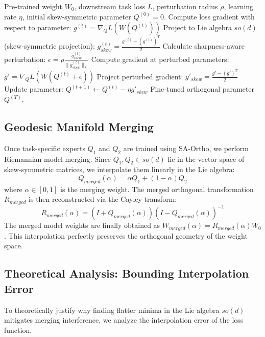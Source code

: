 \documentclass{article}
\theoremstyle{plain}
\theoremstyle{definition}
\theoremstyle{remark}
\begin{document}
\begin{algorithm}[tb]
   \caption{Sharpness-Aware Orthogonal Adaptation (SA-Ortho)}
   \label{alg:sa_ortho}
   \small
\begin{algorithmic}[1]
    Pre-trained weight $W_0$, downstream task loss $L$, perturbation radius $\rho$, learning rate $\eta$, initial skew-symmetric parameter $Q^{(0)} = 0$.
   \STATE Compute loss gradient with respect to parameter: $g^{(t)} = \nabla_Q L(W(Q^{(t)}))$
   \STATE Project to Lie algebra $so(d)$ (skew-symmetric projection): $g_{skew}^{(t)} = \frac{g^{(t)} - (g^{(t)})^T}{2}$
   \STATE Calculate sharpness-aware perturbation: $\epsilon = \rho \frac{g_{skew}^{(t)}}{\|g_{skew}^{(t)}\|_F}$
   \STATE Compute gradient at perturbed parameters: $g' = \nabla_Q L(W(Q^{(t)} + \epsilon))$
   \STATE Project perturbed gradient: $g'_{skew} = \frac{g' - (g')^T}{2}$
   \STATE Update parameter: $Q^{(t+1)} \leftarrow Q^{(t)} - \eta g'_{skew}$
   \ENDFOR
    Fine-tuned orthogonal parameter $Q^{(T)}$.
\end{algorithmic}
\end{algorithm}

\subsection{Geodesic Manifold Merging}
Once task-specific experts $Q_1$ and $Q_2$ are trained using SA-Ortho, we perform Riemannian model merging. Since $Q_1, Q_2 \in so(d)$ lie in the vector space of skew-symmetric matrices, we interpolate them linearly in the Lie algebra:
\begin{equation}
  Q_{merged}(\alpha) = \alpha Q_1 + (1 - \alpha) Q_2
\end{equation}
where $\alpha \in [0, 1]$ is the merging weight. The merged orthogonal transformation $R_{merged}$ is then reconstructed via the Cayley transform:
\begin{equation}
  R_{merged}(\alpha) = (I + Q_{merged}(\alpha))(I - Q_{merged}(\alpha))^{-1}
\end{equation}
The merged model weights are finally obtained as $W_{merged}(\alpha) = R_{merged}(\alpha) W_0$. This interpolation perfectly preserves the orthogonal geometry of the weight space.

\subsection{Theoretical Analysis: Bounding Interpolation Error}
To theoretically justify why finding flatter minima in the Lie algebra $so(d)$ mitigates merging interference, we analyze the interpolation error of the loss function.
\end{document}
